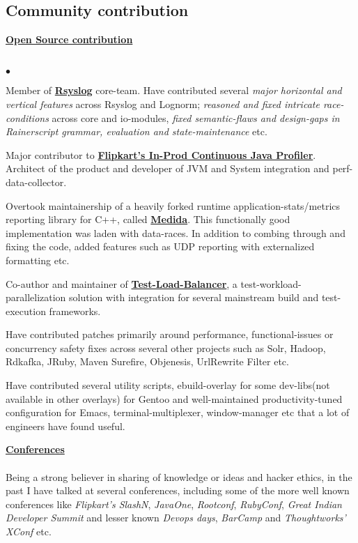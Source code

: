 \documentclass[margin,line]{res}
\newenvironment{list2}{
  \begin{list}{$\bullet$}{%
      \setlength{\itemsep}{0in}
      \setlength{\parsep}{0in} \setlength{\parskip}{0in}
      \setlength{\topsep}{0in} \setlength{\partopsep}{0in} 
      \setlength{\leftmargin}{0.2in}}}{\end{list}}
\begin{document}
\begin{resume}
\section{\sc Community contribution}
{\underline {\bf Open Source contribution}}\\
\vspace{-.2cm}\\
\begin{list2}
\item Member of \href{https://github.com/rsyslog}{\bf Rsyslog} core-team. Have contributed several {\em major horizontal and vertical features} across Rsyslog and Lognorm; {\em reasoned and fixed intricate race-conditions} across core and io-modules, {\em fixed semantic-flaws and design-gaps in Rainerscript grammar, evaluation and state-maintenance} etc.
\item Major contributor to \href{https://github.com/Flipkart/fk-prof}{\bf Flipkart's In-Prod Continuous Java Profiler}. Architect of the product and developer of JVM and System integration and perf-data-collector.
\item Overtook maintainership of a heavily forked runtime application-stats/metrics reporting library for C++, called \href{https://github.com/janmejay/medida}{\bf Medida}. This functionally good implementation was laden with data-races. In addition to combing through and fixing the code, added features such as UDP reporting with externalized formatting etc.
\item Co-author and maintainer of \href{http://test-load-balancer.github.io/}{\bf Test-Load-Balancer}, a test-workload-parallelization solution with integration for several mainstream build and test-execution frameworks.
\item Have contributed patches primarily around performance, functional-issues or concurrency safety fixes across several other projects such as Solr, Hadoop, Rdkafka, JRuby, Maven Surefire, Objenesis, UrlRewrite Filter etc.
\item Have contributed several utility scripts, ebuild-overlay for some dev-libs(not available in other overlays) for Gentoo and well-maintained productivity-tuned configuration for Emacs, terminal-multiplexer, window-manager etc that a lot of engineers have found useful.
\end{list2}

{\underline {\bf Conferences}}\\
\vspace{-.2cm}\\
Being a strong believer in sharing of knowledge or ideas and hacker ethics, in the past I have talked at several conferences, including some of the more well known conferences like {\em Flipkart's SlashN}, {\em JavaOne}, {\em Rootconf}, {\em RubyConf}, {\em Great Indian Developer Summit} and lesser known {\em Devops days}, {\em BarCamp} and {\em Thoughtworks' XConf} etc.\\


\end{resume}
\end{document}

